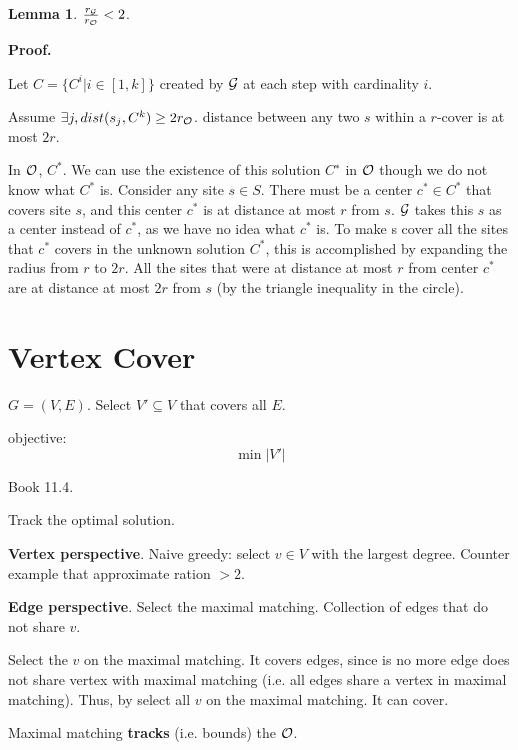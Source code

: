 \documentclass[a4paper]{report}
\theoremstyle{definition}
\newtheorem{lem}{Lemma}[section]
\begin{document}
\begin{lem}
$\frac{r_{\mathcal{G}}}{r_{\mathcal{O}}}<2$. 
\end{lem}

\textbf{Proof.} 

Let $C=\{C^i | i\in[1, k]\}$ created by $\mathcal{G}$ at each step with cardinality $i$. 

Assume $\exists j, dist(s_j, C^k)\geq 2r_{\mathcal{O}}$. distance between any two $s$ within a $r$-cover is at most $2r$.

In $\mathcal{O}$, $C^*$. We can use the existence of this solution $C^∗$ in $\mathcal{O}$ though we do not know what $C^*$ is. Consider any site $s \in S$. There must be a center $c^* \in C^*$ that covers site $s$, and this center $c^*$ is at distance at most $r$ from $s$. $\mathcal{G}$ takes this $s$ as a center instead of $c^*$, as we have no idea what $c^*$ is. To make s cover all the sites that $c^*$ covers in the unknown solution $C^*$, this is accomplished by expanding the radius from $r$ to $2r$. All the sites that were at distance at most $r$ from center $c^*$ are at distance at most $2r$ from $s$ (by the triangle inequality in the circle).

\section{Vertex Cover}
$G=(V, E)$. Select $V'\subseteq V$ that covers all $E$.

objective:
$$\min |V'|$$

Book 11.4. 

Track the optimal solution. 

\textbf{Vertex perspective}. Naive greedy: select $v\in V$ with the largest degree. Counter example that approximate ration $>2$. 

\textbf{Edge perspective}. Select the maximal matching. Collection of edges that do not share $v$. 

Select the $v$ on the maximal matching. It covers edges, since is no more edge does not share vertex with maximal matching (i.e. all edges share a vertex in maximal matching). Thus, by select all $v$ on the maximal matching. It can cover.

Maximal matching \textbf{tracks} (i.e. bounds) the $\mathcal{O}$. 
\end{document}
